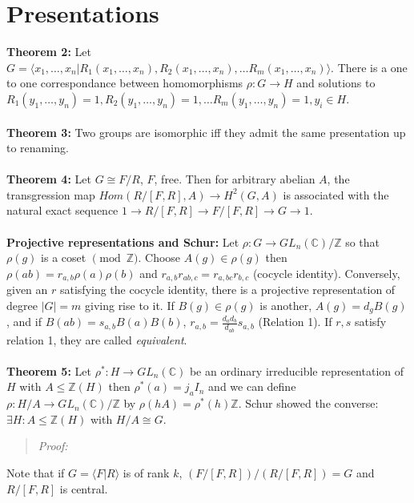 \section {Presentations}
{\bf Theorem 2:}  Let $G=
\langle x_1, \ldots, x_n| R_1(x_1, \ldots, x_n), R_2(x_1, \ldots, x_n), \ldots R_m(x_1, \ldots, x_n)
\rangle $. There is a one to one correspondance between homomorphisms
$\rho: G \rightarrow H$ and solutions to
$R_1(y_1, \ldots, y_n)=1, R_2(y_1, \ldots, y_n)=1, \ldots R_m(y_1, \ldots, y_n)=1, y_i \in H$.
\\
\\
{\bf Theorem 3:}  Two groups are isomorphic iff they admit the same presentation up to renaming.
\\
\\
{\bf Theorem 4:}  Let $G \cong F/R$, $F$, free.  Then for arbitrary abelian $A$, the transgression map
$Hom(R/[F,R],A) \rightarrow H^2(G,A)$ is associated with the natural exact sequence
$1 \rightarrow R/[F,R] \rightarrow F/[F, R] \rightarrow G \rightarrow 1$.
\\
\\
{\bf Projective representations and Schur:} Let $\rho: G \rightarrow GL_n({\mathbb C})/{\mathbb Z}$
so that $\rho(g)$ is a coset $\pmod {\mathbb Z}$.  Choose $A(g) \in \rho(g)$ then
$\rho(ab)= r_{a,b} \rho(a) \rho(b)$ and $r_{a,b} r_{ab,c}= r_{a, bc} r_{b,c}$ (cocycle identity).
Conversely, given an $r$ satisfying the cocycle identity, there is a projective representation
of degree $|G|=m$ giving rise to it.  If $B(g) \in \rho(g)$ is another, $A(g)= d_g B(g)$, and
if $B(ab)= s_{a,b}B(a)B(b)$, $r_{a,b}= {\frac {d_a d_b} {d_{ab}}} s_{a,b}$ (Relation 1).
If $r, s$ satisfy relation 1, they are called \emph{equivalent}.
\\
\\
{\bf Theorem 5:} Let $\rho^*: H \rightarrow GL_n({\mathbb C})$ be an ordinary irreducible
representation of $H$ with $A \le {\mathbb Z}(H)$ then $\rho^*(a)= j_a I_n$ and we can
define $\rho: H/A \rightarrow GL_n({\mathbb C})/{\mathbb Z}$ by
$\rho(hA)= \rho^*(h) {\mathbb Z}$.  Schur showed the converse:
$\exists H: A \le {\mathbb Z}(H)$ with $H/A \cong G$.
\begin{quote}
\emph{Proof:}
\end{quote}
Note that if $G= \langle F|R \rangle $ is of rank $k$,
$(F/[F,R])/(R/[F,R])= G$ and $R/[F,R]$ is central.
